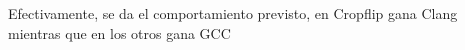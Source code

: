 \begin{figure}[H]
    \centering
    \begin{floatrow}
    \end{floatrow}
\end{figure}

Efectivamente, se da el comportamiento previsto, en Cropflip gana Clang mientras que en los otros gana GCC


